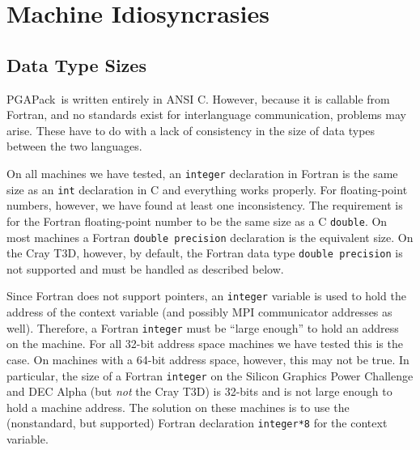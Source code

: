 \documentclass{report}
\newcommand{\pga}{PGAPack}
\begin{document}
\chapter{Machine Idiosyncrasies}\label{chp:start-up}


\section*{Data Type Sizes} 

\pga\ is written entirely in ANSI C.  However, because it is callable from
Fortran, and no standards exist for interlanguage communication, problems may
arise.  These have to do with a lack of consistency in the size of data types
between the two languages.

On all machines we have tested, an {\tt integer} declaration in Fortran is the
same size as an {\tt int} declaration in C and everything works properly.  For
floating-point numbers, however, we have found at least one inconsistency.
The requirement is for the Fortran floating-point number to be the same size
as a C {\tt double}.  On most machines a Fortran {\tt double precision}
declaration is the equivalent size.  On the Cray T3D, however, by default, the
Fortran data type {\tt double precision} is not supported and must be handled
as described below.

Since Fortran does not support pointers, an {\tt integer} variable is used to
hold the address of the context variable (and possibly MPI communicator
addresses as well).  Therefore, a Fortran {\tt integer} must be ``large
enough'' to hold an address on the machine.  For all 32-bit address space
machines we have tested this is the case.  On machines with a 64-bit address
space, however, this may not be true.  In particular, the size of a Fortran
{\tt integer} on the Silicon Graphics Power Challenge and DEC Alpha (but {\em
not} the Cray T3D) is 32-bits and is not large enough to hold a machine
address.  The solution on these machines is to use the (nonstandard, but
supported) Fortran declaration {\tt integer*8} for the context variable.

%  
\end{document}
